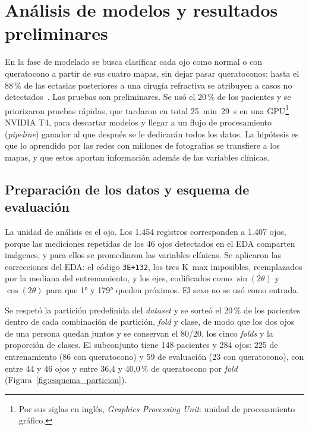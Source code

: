 \section{Análisis de modelos y resultados preliminares}
\label{sec:modelos}

    En la fase de modelado se busca clasificar cada ojo como normal o con queratocono a partir de sus cuatro mapas, sin dejar pasar queratoconos: hasta el 88\,\% de las ectasias posteriores a una cirugía refractiva se atribuyen a casos no detectados~\cite{falsos_negativos_ectasia}. Las pruebas son preliminares. Se usó el 20\,\% de los pacientes y se priorizaron pruebas rápidas, que tardaron en total 25~min~29~s en una GPU\footnote{Por sus siglas en inglés, \textit{Graphics Processing Unit}: unidad de procesamiento gráfico.} NVIDIA T4, para descartar modelos y llegar a un flujo de procesamiento (\textit{pipeline}) ganador al que después se le dedicarán todos los datos. La hipótesis es que lo aprendido por las redes con millones de fotografías se transfiere a los mapas, y que estos aportan información además de las variables clínicas.

    \subsection{Preparación de los datos y esquema de evaluación}

        La unidad de análisis es el ojo. Los 1.454 registros corresponden a 1.407 ojos, porque las mediciones repetidas de los 46 ojos detectados en el EDA comparten imágenes, y para ellos se promediaron las variables clínicas. Se aplicaron las correcciones del EDA: el código \texttt{3E+132}, los tres K~max imposibles, reemplazados por la mediana del entrenamiento, y los ejes, codificados como $\sin(2\theta)$ y $\cos(2\theta)$ para que 1° y 179° queden próximos. El sexo no se usó como entrada.

        Se respetó la partición predefinida del \textit{dataset} y se sorteó el 20\,\% de los pacientes dentro de cada combinación de partición, \textit{fold} y clase, de modo que los dos ojos de una persona quedan juntos y se conservan el 80/20, los cinco \textit{folds} y la proporción de clases. El subconjunto tiene 148 pacientes y 284 ojos: 225 de entrenamiento (86 con queratocono) y 59 de evaluación (23 con queratocono), con entre 44 y 46 ojos y entre 36,4 y 40,0\,\% de queratocono por \textit{fold} (Figura~\ref{fig:esquema_particion}).

